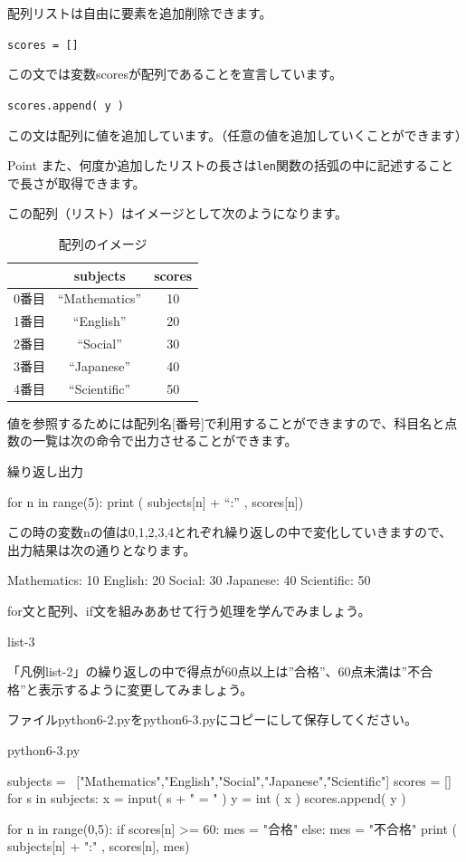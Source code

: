 \documentclass[11pt,a4paper,dvipdfmx,titlepage]{jsreport}
\begin{document}
配列リストは自由に要素を追加削除できます。

{\tt scores = []}

この文では変数scoresが配列であることを宣言しています。

{\tt scores.append( y )}

この文は配列に値を追加しています。（任意の値を追加していくことができます）
\begin{hipoint}{Point}
また、何度か追加したリストの長さは{\tt len}関数の括弧の中に記述することで長さが取得できます。
\end{hipoint}
この配列（リスト）はイメージとして次のようになります。
\newpage
\begin{table}[h]
 \begin{center}
    \caption{配列のイメージ}
\begin{tabular}{|c|c|c|} \hline
      & subjects      & scores \\ \hline \hline
0番目  & “Mathematics” &   10	\\ \hline
1番目  & “English”     &   20 \\ \hline
2番目  & “Social”      &   30 \\ \hline
3番目  & “Japanese”    &   40 \\ \hline
4番目  & “Scientific”  &   50 \\ \hline
\end{tabular}
\end{center}
\end{table}


値を参照するためには配列名[番号]で利用することができますので、科目名と点数の一覧は次の命令で出力させることができます。

\begin{grabox}{繰り返し出力}
\begin{listing}{1}
for n in range(5):
    print ( subjects[n] + “:” , scores[n])
\end{listing}
この時の変数nの値は0,1,2,3,4とれぞれ繰り返しの中で変化していきますので、
出力結果は次の通りとなります。
\begin{listing}{1}
Mathematics: 10
English: 20
Social: 30
Japanese: 40
Scientific: 50
\end{listing}
\end{grabox}
for文と配列、if文を組みああせて行う処理を学んでみましょう。
\begin{pabox}{list-3}

「凡例list-2」の繰り返しの中で得点が60点以上は”合格”、60点未満は”不合格”と表示するように変更してみましょう。

ファイルpython6-2.pyをpython6-3.pyにコピーにして保存してください。
\begin{legbox}{python6-3.py}
\begin{listing}{1}
subjects = \
        ["Mathematics","English","Social","Japanese","Scientific"]
scores = [] 
for s in subjects:
    x = input( s + " = " )
    y = int ( x )
    scores.append( y )

for n in range(0,5):
    if scores[n] >= 60:
        mes = "合格"
    else:
        mes = "不合格"
    print ( subjects[n] + ":" , scores[n], mes)
\end{listing}
\end{legbox}
\end{pabox}
\end{document}
